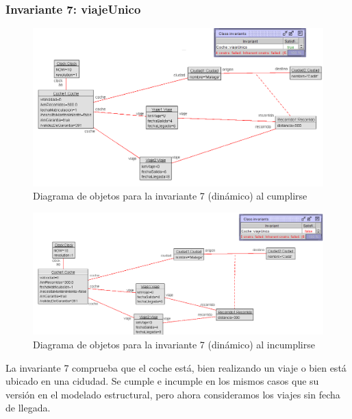 \documentclass[12pt.a4paper]{article}
\begin{document}
\subsubsection{Invariante 7: viajeUnico}
\vspace{1.0 cm}
\begin{figure}[H]
     \includegraphics[width=1\linewidth]{Soils/dinamicoInv7_true.png}
     \caption{Diagrama de objetos para la invariante 7 (dinámico) al cumplirse}
\end{figure}
\begin{figure}[H]
     \includegraphics[width=1\linewidth]{Soils/dinamicoInv7_false.png}
     \caption{Diagrama de objetos para la invariante 7 (dinámico) al incumplirse}
\end{figure}
La invariante 7 comprueba que el coche está, bien realizando un viaje o bien está ubicado en una cidudad. Se cumple e incumple en los mismos casos que su versión en el modelado estructural, pero ahora consideramos los viajes sin fecha de llegada.
\end{document}
